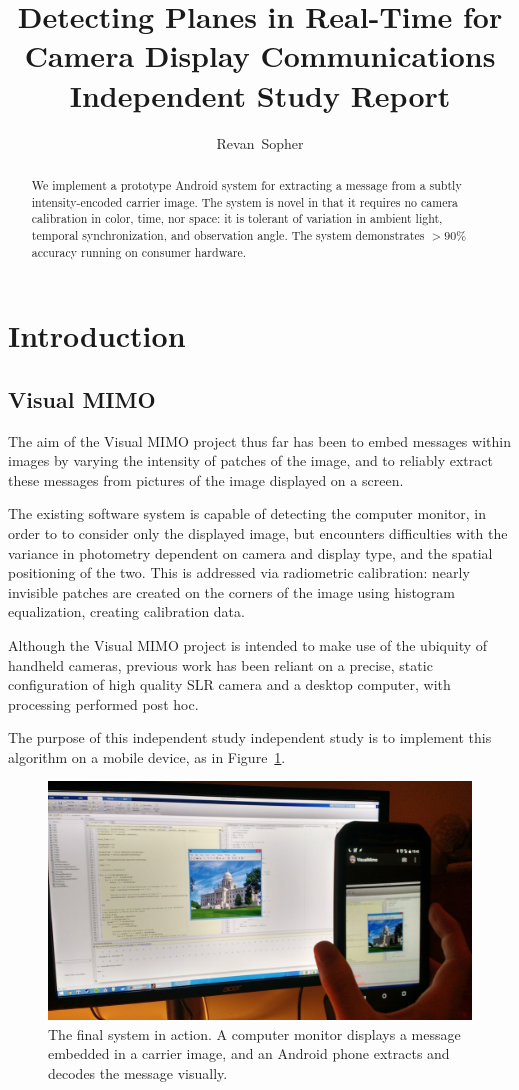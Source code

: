 \documentclass[11pt, letterpaper]{article}
\author{Revan~Sopher}
\title{Detecting Planes in Real-Time for Camera Display Communications\\
{\large Independent Study Report}}
\begin{document}
\maketitle

\begin{abstract}
We implement a prototype Android system for extracting a message from a subtly intensity-encoded carrier image.
The system is novel in that it requires no camera calibration in color, time, nor space: it is tolerant of variation in ambient light, temporal synchronization, and observation angle. The system demonstrates $>90 \%$ accuracy running on consumer hardware.
\end{abstract}

\section{Introduction}

\subsection{Visual MIMO}
The aim of the Visual MIMO project thus far has been to embed messages within images by varying the intensity of patches of the image, and to reliably extract these messages from pictures of the image displayed on a screen.

The existing software system is capable of detecting the computer monitor, in order to to consider only the displayed image, but encounters difficulties with the variance in photometry dependent on camera and display type, and the spatial positioning of the two.
This is addressed via radiometric calibration: nearly invisible patches are created on the corners of the image using histogram equalization, creating calibration data.

Although the Visual MIMO project is intended to make use of the ubiquity of handheld cameras, previous work has been reliant on a precise, static configuration of high quality SLR camera and a desktop computer, with processing performed post hoc.

The purpose of this independent study independent study is to implement this algorithm on a mobile device, as in Figure~\ref{fig:system}.

\begin{figure}[hbtp]
\centering
\includegraphics[width=0.5 \textwidth]{img/system.jpg}
\caption{The final system in action. A computer monitor displays a message embedded in a carrier image, and an Android phone extracts and decodes the message visually.}
\label{fig:system}
\end{figure}
\end{document}
